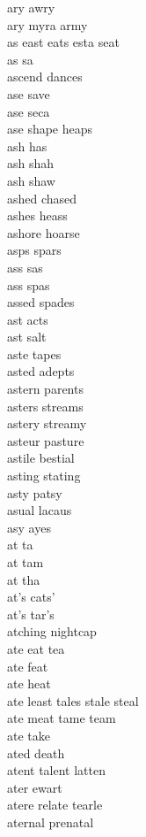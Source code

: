 ary awry \\
ary myra army \\
as east eats esta seat  \\
as sa\\
ascend dances\\
ase save \\
ase seca \\
ase shape heaps  \\
ash has\\
ash shah \\
ash shaw \\
ashed chased \\
ashes heass\\
ashore hoarse\\
asps spars \\
ass sas\\
ass spas \\
assed spades \\
ast acts \\
ast salt \\
aste tapes \\
asted adepts \\
astern parents \\
asters streams \\
astery streamy \\
asteur pasture \\
astile bestial \\
asting stating \\
asty patsy \\
asual lacaus \\
asy ayes \\
at ta\\
at tam \\
at tha \\
at's cats' \\
at's tar's \\
atching nightcap \\
ate eat tea\\
ate feat \\
ate heat \\
ate least tales stale steal  \\
ate meat tame team \\
ate take \\
ated death \\
atent talent latten \\
ater ewart \\
atere relate tearle \\
aternal prenatal \\
